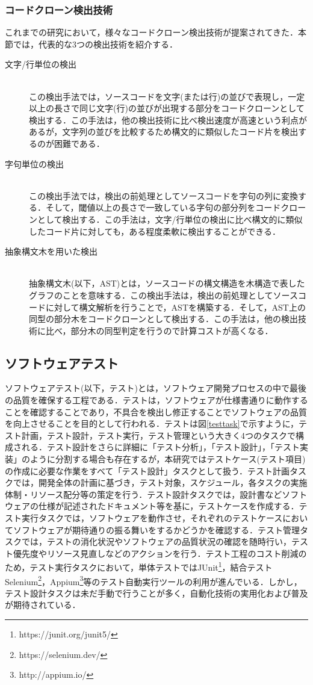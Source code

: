 \documentclass[12pt]{jarticle} %
\begin{document}
\subsubsection{コードクローン検出技術}
これまでの研究において，様々なコードクローン検出技術が提案されてきた\cite{c6,c1}．本節では，代表的な3つの検出技術を紹介する．

\begin{description}
\item[文字/行単位の検出]~\\
この検出手法では，ソースコードを文字(または行)の並びで表現し，一定以上の長さで同じ文字(行)の並びが出現する部分をコードクローンとして検出する．この手法は，他の検出技術に比べ検出速度が高速という利点があるが，文字列の並びを比較するため構文的に類似したコード片を検出するのが困難である．
\item[字句単位の検出]~\\
この検出手法では，検出の前処理としてソースコードを字句の列に変換する．そして，閾値以上の長さで一致している字句の部分列をコードクローンとして検出する．この手法は，文字/行単位の検出に比べ構文的に類似したコード片に対しても，ある程度柔軟に検出することができる．
\item[抽象構文木を用いた検出]~\\
抽象構文木(以下，AST)とは，ソースコードの構文構造を木構造で表したグラフのことを意味する．この検出手法は，検出の前処理としてソースコードに対して構文解析を行うことで，ASTを構築する．そして，AST上の同型の部分木をコードクローンとして検出する．この手法は，他の検出技術に比べ，部分木の同型判定を行うので計算コストが高くなる．
\end{description}

\subsection{ソフトウェアテスト}
ソフトウェアテスト(以下，テスト)とは，ソフトウェア開発プロセスの中で最後の品質を確保する工程である．テストは，ソフトウェアが仕様書通りに動作することを確認することであり，不具合を検出し修正することでソフトウェアの品質を向上させることを目的として行われる．テストは図\ref{testtask}で示すように，テスト計画，テスト設計，テスト実行，テスト管理という大きく4つのタスクで構成される．テスト設計をさらに詳細に「テスト分析」，「テスト設計」，「テスト実装」のように分割する場合も存在するが，本研究ではテストケース(テスト項目)の作成に必要な作業をすべて「テスト設計」タスクとして扱う．テスト計画タスクでは，開発全体の計画に基づき，テスト対象，スケジュール，各タスクの実施体制・リソース配分等の策定を行う．テスト設計タスクでは，設計書などソフトウェアの仕様が記述されたドキュメント等を基に，テストケースを作成する．テスト実行タスクでは，ソフトウェアを動作させ，それぞれのテストケースにおいてソフトウェアが期待通りの振る舞いをするかどうかを確認する．テスト管理タスクでは，テストの消化状況やソフトウェアの品質状況の確認を随時行い，テスト優先度やリソース見直しなどのアクションを行う．テスト工程のコスト削減のため，テスト実行タスクにおいて，単体テストではJUnit\footnote{https://junit.org/junit5/}，結合テストSelenium\footnote{https://selenium.dev/}，Appium\footnote{http://appium.io/}等のテスト自動実行ツールの利用が進んでいる．しかし，テスト設計タスクは未だ手動で行うことが多く，自動化技術の実用化および普及が期待されている．
\end{document}
